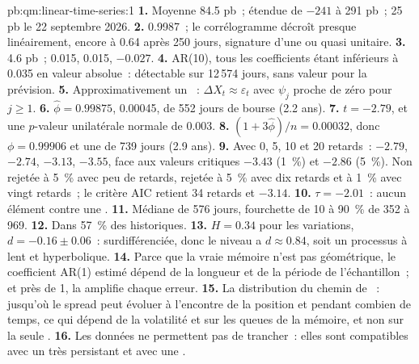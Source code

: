\begin{solution}{pb:qm:linear-time-series:1}
\textbf{1.} Moyenne 84.5 pb~; étendue de $-241$ à 291 pb~; 25 pb le 22 septembre 2026.
\textbf{2.} 0.9987~; le corrélogramme décroît presque linéairement, encore à 0.64 après 250 jours, signature d'une  ou quasi unitaire.
\textbf{3.} 4.6 pb~; 0.015, 0.015, $-0.027$.
\textbf{4.} AR(10), tous les coefficients étant inférieurs à 0.035 en valeur absolue~: détectable sur 12\,574 jours, sans valeur pour la prévision.
\textbf{5.} Approximativement un ~: $\Delta X_t \approx \varepsilon_t$ avec $\psi_j$ proche de zéro pour $j \ge 1$.
\textbf{6.} $\hat\phi = 0.99875$,  0.00045,  de 552 jours de bourse (2.2 ans).
\textbf{7.} $t = -2.79$, et une $p$-valeur unilatérale normale de 0.003.
\textbf{8.} $(1 + 3\hat\phi)/n = 0.00032$, donc $\phi = 0.99906$ et une  de 739 jours (2.9 ans).
\textbf{9.} Avec 0, 5, 10 et 20 retards~: $-2.79$, $-2.74$, $-3.13$, $-3.55$, face aux valeurs critiques $-3.43$ (1~\%) et $-2.86$ (5~\%). Non rejetée à 5~\% avec
peu de retards, rejetée à 5~\% avec dix retards et à 1~\% avec vingt retards~; le critère AIC retient 34 retards et $-3.14$.
\textbf{10.} $\tau = -2.01$~: aucun élément contre une .
\textbf{11.} Médiane de 576 jours, fourchette de 10 à 90~\% de 352 à 969.
\textbf{12.} Dans 57~\% des historiques.
\textbf{13.} $H = 0.34$ pour les variations, $d = -0.16 \pm 0.06$~: surdifférenciée, donc le niveau a $d \approx 0.84$, soit un
processus à  lent et hyperbolique.
\textbf{14.} Parce que la vraie mémoire n'est pas géométrique, le coefficient AR(1) estimé dépend de la longueur et de la période de l'échantillon~; et près de 1, la 
amplifie chaque erreur.
\textbf{15.} La distribution du chemin de ~: jusqu'où le spread peut évoluer à l'encontre de la position et pendant combien de temps, ce qui dépend de la volatilité
et sur les queues de la mémoire, et non sur la seule .
\textbf{16.} Les données ne permettent pas de trancher~: elles sont compatibles avec un  très persistant et avec une .

\end{solution}
